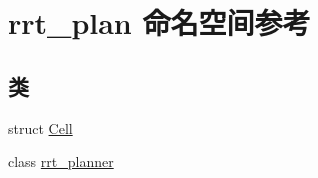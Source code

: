 \hypertarget{namespacerrt__plan}{\section{rrt\-\_\-plan 命名空间参考}
\label{namespacerrt__plan}
}
\subsection*{类}
\begin{DoxyCompactItemize}
\item 
struct \hyperlink{structrrt__plan_1_1Cell}{Cell}
\item 
class \hyperlink{classrrt__plan_1_1rrt__planner}{rrt\-\_\-planner}
\end{DoxyCompactItemize}

